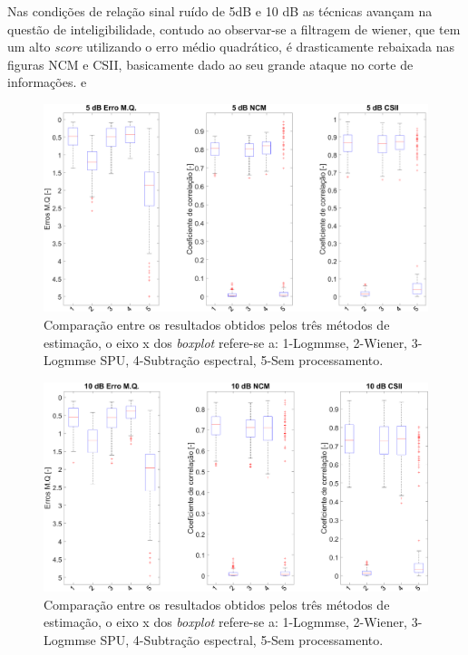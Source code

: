 Nas condições de relação sinal ruído de 5dB e 10 dB as técnicas avançam na questão de inteligibilidade, contudo ao observar-se a filtragem de wiener, que tem um alto \textit{score} utilizando o erro médio quadrático, é drasticamente rebaixada nas figuras NCM e CSII, basicamente dado ao seu grande ataque no corte de informações.  e 
\begin{figure}[H]
\centering
\includegraphics[width=1\linewidth]{Figs/int_5}
\caption{Comparação entre os resultados obtidos pelos três métodos de estimação, o eixo x dos \textit{boxplot} refere-se a: 1-Logmmse, 2-Wiener, 3-Logmmse SPU, 4-Subtração espectral, 5-Sem processamento.}
\label{i4}
\end{figure}

\begin{figure}[H]
\centering
\includegraphics[width=1\linewidth]{Figs/int_10}
\caption{Comparação entre os resultados obtidos pelos três métodos de estimação, o eixo x dos \textit{boxplot} refere-se a: 1-Logmmse, 2-Wiener, 3-Logmmse SPU, 4-Subtração espectral, 5-Sem processamento.}
\label{i5}
\end{figure}


